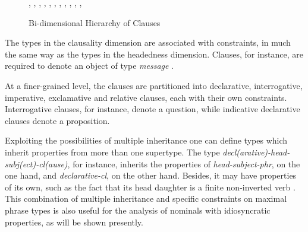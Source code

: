 \documentclass[output=paper]{langsci/langscibook}
\begin{document}
\begin{figure}
\footnotesize
\begin{center}
\tree
    {,
      {, 
        {,
          {}, 
          {}}, 
        {}}, 
      {,
        {,
          {, 
            {}},
          {}}, 
        {}}} 
\caption{Bi-dimensional Hierarchy of Clauses \label{bidim}}  
\normalsize
\end{center}
\end{figure}

The types in the {\sc clausality} dimension are associated with constraints,
in much the same way as the types in the {\sc headedness} dimension.  
Clauses, for instance, are required to denote an object of type {\it message\/} 
\citep[41]{GS00}.

\begin{exe}
\ex 
\begin{avm} 
\end{avm}
\end{exe}

\noindent
At a finer-grained level, the clauses are partitioned into 
declarative, interrogative, imperative, exclamative and relative
clauses, each with their own constraints. 
Interrogative clauses, for instance, denote a question, 
while indicative declarative clauses denote a proposition.

Exploiting the possibilities of multiple inheritance one can 
define types which inherit properties from more than one supertype. 
The type {\it decl(arative)-head-subj(ect)-cl(ause)}, for instance, inherits 
the properties of {\it head-subject-phr}, on the one hand, and 
{\it declarative-cl}, on the other hand. Besides, it may 
have properties of its own, such as the fact that its head daughter 
is a finite non-inverted verb \citep[43]{GS00}. 
This combination of multiple inheritance and specific   
constraints on maximal phrase types is also useful for the analysis of 
nominals with idiosyncratic properties, as will be shown presently. 
\end{document}
